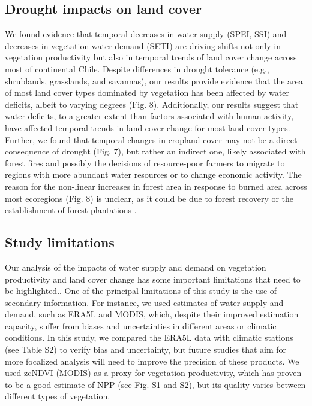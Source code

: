 \documentclass[
  sn-nature,
  numbered]{sn-jnl}
\begin{document}
\subsection{Drought impacts on land
cover}\label{drought-impacts-on-land-cover}

We found evidence that temporal decreases in water supply (SPEI, SSI)
and decreases in vegetation water demand (SETI) are driving shifts not
only in vegetation productivity but also in temporal trends of land
cover change across most of continental Chile. Despite differences in
drought tolerance (e.g., shrublands, grasslands, and savannas), our
results provide evidence that the area of most land cover types
dominated by vegetation has been affected by water deficits, albeit to
varying degrees (Fig. 8). Additionally, our results suggest that water
deficits, to a greater extent than factors associated with human
activity, have affected temporal trends in land cover change for most
land cover types. Further, we found that temporal changes in cropland
cover may not be a direct consequence of drought (Fig. 7), but rather an
indirect one, likely associated with forest fires and possibly the
decisions of resource-poor farmers to migrate to regions with more
abundant water resources or to change economic
activity\citep{AghaKouchak2021, Hermans2021}. The reason for the
non-linear increases in forest area in response to burned area across
most ecoregions (Fig. 8) is unclear, as it could be due to forest
recovery\citep{UrrutiaJalabert2018} or the establishment of forest
plantations \citep{Smith2021}.

\subsection{Study limitations}\label{study-limitations}

Our analysis of the impacts of water supply and demand on vegetation
productivity and land cover change has some important limitations that
need to be highlighted.. One of the principal limitations of this study
is the use of secondary information. For instance, we used estimates of
water supply and demand, such as ERA5L and MODIS, which, despite their
improved estimation capacity, suffer from biases and
uncertainties\citep{Gomis2023, Clelland2024} in different areas or
climatic conditions. In this study, we compared the ERA5L data with
climatic stations (see Table S2) to verify bias and uncertainty, but
future studies that aim for more focalized analysis will need to improve
the precision of these products. We used zcNDVI\citep{Zambrano2018}
(MODIS) as a proxy for vegetation productivity, which has proven to be a
good estimate of NPP (see Fig. S1 and S2), but its quality varies
between different types of vegetation.
\end{document}
